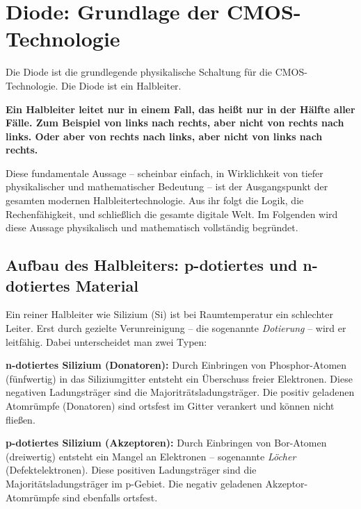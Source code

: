 ﻿\documentclass[12pt, a4paper]{article}
\begin{document}
	\section[Diode: Grundlage der CMOS-Technologie]{Diode: Grundlage der CMOS-Technologie}
	
	Die Diode ist die grundlegende physikalische Schaltung für die
	CMOS-Technologie. Die Diode ist ein Halbleiter.
	
	\textbf{Ein Halbleiter leitet nur in einem Fall, das heißt nur in der
		Hälfte aller Fälle. Zum Beispiel von links nach rechts, aber nicht von rechts
		nach links. Oder aber von rechts nach links, aber nicht von links nach rechts.}
	
	Diese fundamentale Aussage -- scheinbar einfach, in Wirklichkeit von tiefer
	physikalischer und mathematischer Bedeutung -- ist der Ausgangspunkt der
	gesamten modernen Halbleitertechnologie. Aus ihr folgt die Logik, die
	Rechenfähigkeit, und schließlich die gesamte digitale Welt. Im Folgenden wird
	diese Aussage physikalisch und mathematisch vollständig begründet.
	
	\subsection{Aufbau des Halbleiters: p-dotiertes und n-dotiertes Material}
	
	Ein reiner Halbleiter wie Silizium (Si) ist bei Raumtemperatur ein schlechter
	Leiter. Erst durch gezielte Verunreinigung -- die sogenannte \textit{Dotierung}
	-- wird er leitfähig. Dabei unterscheidet man zwei Typen:
	
	\textbf{n-dotiertes Silizium (Donatoren):} Durch Einbringen von
	Phosphor-Atomen (fünfwertig) in das Siliziumgitter entsteht ein Überschuss
	freier Elektronen. Diese negativen Ladungsträger sind die Majoriträtsladungsträger.
	Die positiv geladenen Atomrümpfe (Donatoren) sind ortsfest im Gitter verankert
	und können nicht fließen.
	
	\textbf{p-dotiertes Silizium (Akzeptoren):} Durch Einbringen von Bor-Atomen
	(dreiwertig) entsteht ein Mangel an Elektronen -- sogenannte
	\textit{Löcher} (Defektelektronen). Diese positiven Ladungsträger sind die
	Majoritätsladungsträger im p-Gebiet. Die negativ geladenen Akzeptor-Atomrümpfe
	sind ebenfalls ortsfest.
	
\end{document}
